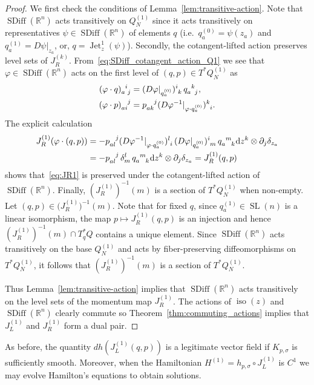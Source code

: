 \documentclass[12pt]{amsart}
\newcommand{\R}{\ensuremath{\mathbb{R}}}
\newcommand{\dz}{\ensuremath{\textrm{d}z}}
\DeclareMathOperator{\SDiff}{SDiff}
\DeclareMathOperator{\Jet}{Jet}
\DeclareMathOperator{\SL}{SL}
\DeclareMathOperator{\iso}{iso}
\begin{document}
  \begin{proof}
  We first check the conditions of Lemma~\ref{lem:transitive-action}.
  Note that $\SDiff(\R^n)$ acts transitively on $Q^{(1)}_N$ since it
  acts transitively on representatives $\psi \in \SDiff(\R^n)$ of
  elements $q$ (i.e.\ $q^{(0)}_a = \psi(z_a)$ and
  $q^{(1)}_a = D\psi|_{z_a}$, or, $q = \Jet^1_z(\psi)$). Secondly, the
  cotangent-lifted action preserves level sets of $J_R^{(k)}$.
  From~\eqref{eq:SDiff_cotangent_action_Q1} we see that $\varphi \in
  \SDiff(\R^n)$ acts on the first level of $(q,p) \in T^* Q^{(1)}_N$ as
  \begin{align*}
    (\varphi\cdot q)\indices{_a^i_j} &= (D\varphi|_{q^{(0)}_a})\indices{^i_k}\,q\indices{_a^k_j}, \\
    (\varphi\cdot p)\indices{_a_i^j} &= p\indices{_a_k^j}(D\varphi^{-1}|_{\varphi\cdot q^{(0)}_a})\indices{^k_i}.
  \end{align*}
  The explicit calculation
  \begin{align*}
    J_R^{(1)}(\varphi\cdot(q,p))
    &= - p\indices{_a_l^j} (D\varphi^{-1}|_{\varphi\cdot q^{(0)}_a})\indices{^l_i} \,
         (D\varphi|_{q^{(0)}_a})\indices{^i_m}\, q\indices{_a^m_k}
         \dz^k \otimes \partial_j \delta_{z_a} \\
    &= - p\indices{_a_l^j} \, \delta^l_m \, q\indices{_a^m_k}
         \dz^k \otimes \partial_j \delta_{z_a} = J_R^{(1)}(q,p)
  \end{align*}
  shows that~\eqref{eq:JR1} is preserved under the cotangent-lifted
  action of $\SDiff(\R^n)$. Finally, $(J_R^{(1)})^{-1}(m)$ is a
  section of $T^* Q^{(1)}_N$ when non-empty. Let
  $(q,p) \in \big(J_R^{(1)}\big)^{-1}(m)$. Note that for fixed $q$,
  since $q_a^{(1)} \in \SL(n)$ is a linear isomorphism, the map
  $p \mapsto J_R^{(1)}(q,p)$ is an injection and hence
  $(J_R^{(1)})^{-1}(m) \cap T^*_q Q$ contains a unique element. Since
  $\SDiff(\R^n)$ acts transitively on the base $Q^{(1)}_N$ and acts by
  fiber-preserving diffeomorphisms on $T^* Q^{(1)}_N$, it follows that
  $(J_R^{(1)})^{-1}(m)$ is a section of $T^* Q^{(1)}_N$.

  Thus Lemma~\ref{lem:transitive-action} implies that $\SDiff(\R^n)$
  acts transitively on the level sets of the momentum map $J_R^{(1)}$.
  The actions of $\iso(z)$ and $\SDiff(\R^n)$ clearly commute so
  Theorem~\ref{thm:commuting_actions} implies that $J_L^{(1)}$ and
  $J_R^{(1)}$ form a dual pair.
  \end{proof}

  As before, the quantity $dh( J_L^{(1)}(q,p))$ is a legitimate vector field
  if $K_{p,\sigma}$ is sufficiently smooth.  Moreover, when the Hamiltonian
  $H^{(1)} = h_{p,\sigma} \circ J_L^{(1)}$ is $C^1$ we may evolve Hamilton's equations
  to obtain solutions.
\end{document}
